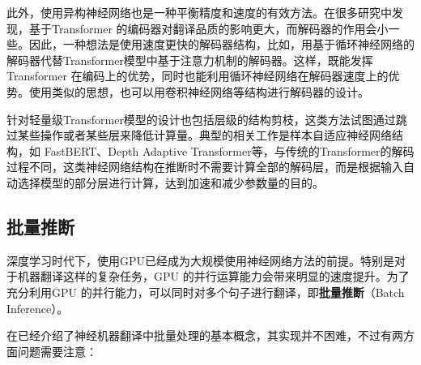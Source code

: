 \parinterval 此外，使用异构神经网络也是一种平衡精度和速度的有效方法。在很多研究中发现，基于Transformer 的编码器对翻译品质的影响更大，而解码器的作用会小一些。因此，一种想法是使用速度更快的解码器结构，比如，用基于循环神经网络的解码器代替Transformer模型中基于注意力机制的解码器。这样，既能发挥Transformer 在编码上的优势，同时也能利用循环神经网络在解码器速度上的优势。使用类似的思想，也可以用卷积神经网络等结构进行解码器的设计。

\parinterval 针对轻量级Transformer模型的设计也包括层级的结构剪枝，这类方法试图通过跳过某些操作或者某些层来降低计算量。典型的相关工作是样本自适应神经网络结构，如 FastBERT、Depth Adaptive Transformer等，与传统的Transformer的解码过程不同，这类神经网络结构在推断时不需要计算全部的解码层，而是根据输入自动选择模型的部分层进行计算，达到加速和减少参数量的目的。


\subsection{批量推断}

\parinterval 深度学习时代下，使用GPU已经成为大规模使用神经网络方法的前提。特别是对于机器翻译这样的复杂任务，GPU 的并行运算能力会带来明显的速度提升。为了充分利用GPU 的并行能力，可以同时对多个句子进行翻译，即{\small\sffamily\bfseries{批量推断}}（Batch Inference）。

\parinterval 在\chapterten 已经介绍了神经机器翻译中批量处理的基本概念，其实现并不困难，不过有两方面问题需要注意：

